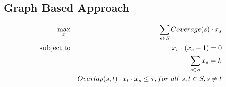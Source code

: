 
\subsection{Graph Based Approach}
\begin{eqnarray*}
\max_{x} && \sum_{s\in S}{Coverage(s)\cdot x_s} \\
\rm{subject~to} && x_s\cdot (x_s-1)=0\\
&&\sum_{s\in S}{x_s}=k\\
&& Overlap(s,t)\cdot x_t\cdot x_s\leq \tau, for\ all\ s,t\in S, s\neq t
\end{eqnarray*}

